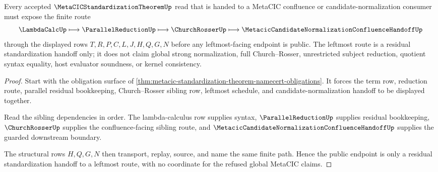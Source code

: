 \begin{theorem}
\label{thm:metacic-standardization-theorem-leftmost-route}
Every accepted $\MetaCICStandardizationTheoremUp$ read that is handed to a MetaCIC confluence or candidate-normalization consumer must expose the finite route
$$
\LambdaCalcUp \longmapsto \ParallelReductionUp \longmapsto \ChurchRosserUp \longmapsto \MetacicCandidateNormalizationConfluenceHandoffUp
$$
through the displayed rows $T,R,P,C,L,J,H,Q,G,N$ before any leftmost-facing endpoint is public. The leftmost route is a residual standardization handoff only; it does not claim global strong normalization, full Church--Rosser, unrestricted subject reduction, quotient syntax equality, host evaluator soundness, or kernel consistency.
\end{theorem}
\begin{proof}
Start with the obligation surface of \autoref{thm:metacic-standardization-theorem-namecert-obligations}. It forces the term row, reduction route, parallel residual bookkeeping, Church--Rosser sibling row, leftmost schedule, and candidate-normalization handoff to be displayed together.

Read the sibling dependencies in order. The lambda-calculus row supplies syntax, $\ParallelReductionUp$ supplies residual bookkeeping, $\ChurchRosserUp$ supplies the confluence-facing sibling route, and $\MetacicCandidateNormalizationConfluenceHandoffUp$ supplies the guarded downstream boundary.

The structural rows $H,Q,G,N$ then transport, replay, source, and name the same finite path. Hence the public endpoint is only a residual standardization handoff to a leftmost route, with no coordinate for the refused global MetaCIC claims.
\end{proof}


